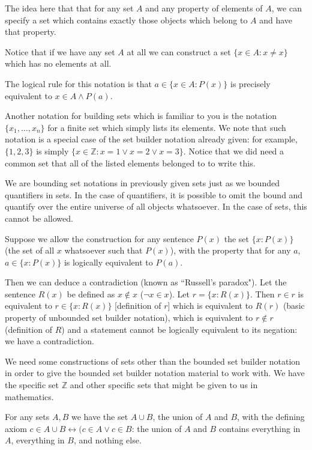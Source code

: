 \documentclass[12pt]{article}
\begin{document}
The idea here that that for any set $A$ and any property of elements of $A$, we can specify a set which contains exactly those objects which belong to $A$ and have that property.

Notice that if we have any set $A$ at all we can construct a set $\{x \in A:x \neq x\}$ which has no elements at all.

The logical rule for this notation is that $a \in \{x \in A: P(x)\}$ is precisely equivalent to $x \in A \wedge P(a)$.

Another notation for building sets which is familiar to you is the notation $\{x_1,\ldots,x_n\}$ for a finite set which simply lists its elements.  We note that such notation is a special case of the set builder notation already given:  for example, $\{1,2,3\}$ is simply $\{x \in \mathbb Z:x=1 \vee x=2 \vee x=3\}$.  Notice that we did need a common set that all of the listed elements belonged to to write this.

We are bounding set notations in previously given sets just as we bounded quantifiers in sets.  In the case of quantifiers, it is possible to omit the bound and quantify over the entire universe of all objects whatsoever.  In the case of sets, this cannot be allowed.

Suppose we allow the construction for any sentence $P(x)$ the set \newline $\{x : P(x)\}$ (the set of all $x$ whatsoever such that $P(x)$), with the property that for any $a$, $a \in \{x:P(x)\}$ is logically equivalent to $P(a)$.

Then we can deduce a contradiction (known as ``Russell's paradox").  Let the sentence $R(x)$ be defined
as $x \not\in x$ ($\neg x \in x$).  Let $r = \{x : R(x)\}$.  Then $r \in r$ is equivalent to $r \in \{x : R(x)\}$ [definition of $r$] which is equivalent to $R(r)$ (basic property of unbounded set builder notation), which is equivalent to $r \not\in r$ (definition of $R$) and a statement cannot be logically equivalent to its negation:  we have a contradiction.

We need some constructions of sets other than the bounded set builder notation in order to give the bounded set builder notation material to work with.  We have the specific set $\mathbb Z$ and other specific sets that might be given to us in mathematics.

For any sets $A, B$ we have the set $A \cup B$, the union of $A$ and $B$, with the defining axiom
$c \in A \cup B \leftrightarrow (c \in A \vee c \in B$:  the union of $A$ and $B$ contains everything in $A$, everything in $B$, and nothing else.
\end{document}
